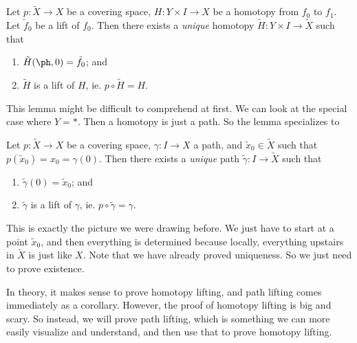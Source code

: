 \documentclass[a4paper]{article}
\begin{document}
\begin{lemma}
  Let $p: \tilde{X} \to X$ be a covering space, $H: Y\times I \to X$ be a homotopy from $f_0$ to $f_1$. Let $\tilde{f}_0$ be a lift of $f_0$. Then there exists a \emph{unique} homotopy $\tilde{H}: Y\times I \to \tilde{X}$ such that
  \begin{enumerate}
    \item $\tilde{H}(\ph, 0) = \tilde{f}_0$; and
    \item $\tilde{H}$ is a lift of $H$, ie. $p\circ\tilde{H} = H$.
  \end{enumerate}
\end{lemma}
This lemma might be difficult to comprehend at first. We can look at the special case where $Y = *$. Then a homotopy is just a path. So the lemma specializes to
\begin{lemma}
  Let $p: \tilde{X} \to X$ be a covering space, $\gamma: I\to X$ a path, and $\tilde{x}_0 \in \tilde{X}$ such that $p(\tilde{x}_0) = x_0 = \gamma(0)$. Then there exists a \emph{unique} path $\tilde{\gamma}: I\to \tilde{X}$ such that
  \begin{enumerate}
    \item $\tilde{\gamma}(0) = \tilde{x}_0$; and
    \item $\tilde{\gamma}$ is a lift of $\gamma$, ie. $p\circ \tilde{\gamma} = \gamma$.
  \end{enumerate}
\end{lemma}
This is exactly the picture we were drawing before. We just have to start at a point $\tilde{x}_0$, and then everything is determined because locally, everything upstairs in $\tilde{X}$ is just like $X$. Note that we have already proved uniqueness. So we just need to prove existence.

In theory, it makes sense to prove homotopy lifting, and path lifting comes immediately as a corollary. However, the proof of homotopy lifting is big and scary. So instead, we will prove path lifting, which is something we can more easily visualize and understand, and then use that to prove homotopy lifting.
\end{document}

